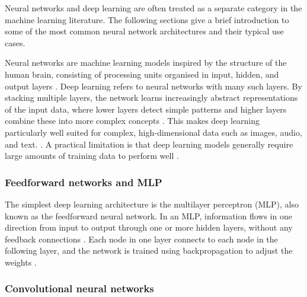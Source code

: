 Neural networks and deep learning are often treated as a separate category 
in the machine learning literature.
The following sections give a brief introduction to some of the most 
common neural network architectures and their typical use cases.

Neural networks are machine learning models inspired by the structure of the 
human brain, consisting of processing units organised in input, hidden, and 
output layers 
\parencite{shrestha2019review_deep_learning_algorithms_architectures}. 
Deep learning refers to neural networks with many such layers. By stacking 
multiple layers, the network learns increasingly abstract representations 
of the input data, where lower layers detect simple patterns and higher 
layers combine these into more complex concepts 
\parencite{lecun2015deep_learning}. 
This makes deep learning particularly well suited for complex, 
high-dimensional data such as images, audio, and text.
\parencite{lecun2015deep_learning, 
alzubaidi2021review_deep_learning_concepts}. 
A practical limitation is that deep learning models generally require 
large amounts of training data to perform well 
\parencite{alzubaidi2021review_deep_learning_concepts}.

\subsubsection*{Feedforward networks and MLP}

The simplest deep learning architecture is the multilayer perceptron (MLP), 
also known as the feedforward neural network. In an MLP, information flows 
in one direction from input to output through one or more hidden layers, 
without any feedback connections 
\parencite{shrestha2019review_deep_learning_algorithms_architectures, 
sarker2021machine_learning_algorithms_real_world_applications_research_directions}. 
Each node in one layer connects to each node in the following layer, and 
the network is trained using backpropagation to adjust the weights 
\parencite{lecun2015deep_learning}.

\subsubsection*{Convolutional neural networks}

